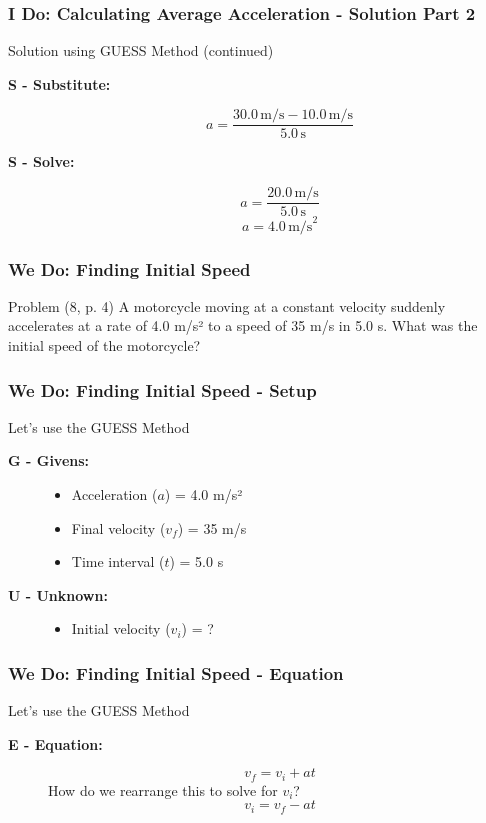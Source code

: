 \documentclass{beamer}
\begin{document}
\begin{frame}
\frametitle{I Do: Calculating Average Acceleration - Solution Part 2}
\begin{block}{Solution using GUESS Method (continued)}
\begin{description}
    \item[\textbf{S - Substitute:}]
        \[ a = \frac{30.0 \, \text{m/s} - 10.0 \, \text{m/s}}{5.0 \, \text{s}} \]
    \item[\textbf{S - Solve:}]
        \[ a = \frac{20.0 \, \text{m/s}}{5.0 \, \text{s}} \]
        \[ a = 4.0 \, \text{m/s}^2 \]
\end{description}
\end{block}
\end{frame}

\begin{frame}
\frametitle{We Do: Finding Initial Speed}
\begin{block}{Problem (8, p. 4)}
A motorcycle moving at a constant velocity suddenly accelerates at a rate of 4.0 m/s² to a speed of 35 m/s in 5.0 s. What was the initial speed of the motorcycle?
\end{block}
\end{frame}

\begin{frame}
\frametitle{We Do: Finding Initial Speed - Setup}
\begin{block}{Let's use the GUESS Method}
\begin{description}
    \item[\textbf{G - Givens:}]
        \begin{itemize}
            \item Acceleration ($a$) = 4.0 m/s²
            \item Final velocity ($v_f$) = 35 m/s
            \item Time interval ($t$) = 5.0 s
        \end{itemize}
    \item[\textbf{U - Unknown:}]
        \begin{itemize}
            \item Initial velocity ($v_i$) = ?
        \end{itemize}
\end{description}
\end{block}
\end{frame}

\begin{frame}
\frametitle{We Do: Finding Initial Speed - Equation}
\begin{block}{Let's use the GUESS Method}
\begin{description}
    \item[\textbf{E - Equation:}]
        \[ v_f = v_i + at \]
        \alert{How do we rearrange this to solve for $v_i$?}
        \pause
        \[ v_i = v_f - at \]
\end{description}
\end{block}
\end{frame}
\end{document}
